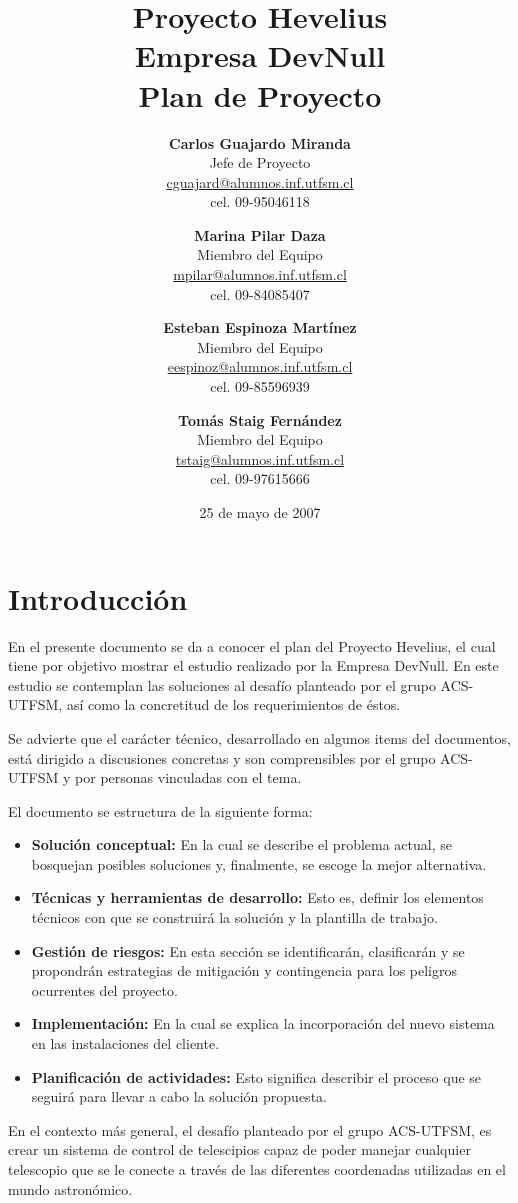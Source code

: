 \documentclass[letterpaper,spanish,10pt]{article}
\title{{\Huge \bf Proyecto Hevelius} \\ {\Large Empresa DevNull} \\ {\small Plan de Proyecto}}
\author{
{\bf Carlos Guajardo Miranda} \\ Jefe de Proyecto \\ \url{cguajard@alumnos.inf.utfsm.cl} \\ cel. 09-95046118 
\and
{\bf Marina Pilar Daza} \\ Miembro del Equipo \\ \url{mpilar@alumnos.inf.utfsm.cl} \\ cel. 09-84085407
\and
{\bf Esteban Espinoza Mart\'inez} \\ Miembro del Equipo \\ \url{eespinoz@alumnos.inf.utfsm.cl} \\ cel. 09-85596939
\and
{\bf Tom\'as Staig Fern\'andez} \\ Miembro del Equipo \\ \url{tstaig@alumnos.inf.utfsm.cl} \\ cel. 09-97615666
}
\date{25 de mayo de 2007}
\begin{document}
\maketitle
\newpage

\tableofcontents{}
\newpage




\section{Introducci\'on} %
En el presente documento se da a conocer el plan del Proyecto Hevelius, el cual 
tiene por objetivo mostrar el estudio realizado por la Empresa DevNull. 
En este estudio se contemplan las soluciones al desaf\'io planteado por el grupo
ACS-UTFSM, as\'i como la concretitud de los requerimientos de \'estos.

Se advierte que el car\'acter t\'ecnico, desarrollado en algunos items del documentos,
est\'a dirigido a discusiones concretas y son comprensibles por el grupo ACS-UTFSM 
y por personas vinculadas con el tema.

El documento se estructura de la siguiente forma:
\begin{itemize}
        \item \textbf{Soluci\'on conceptual:} En la cual se describe el problema 
actual, se bosquejan posibles soluciones y, finalmente, se escoge la mejor alternativa.
        \item \textbf{T\'ecnicas y herramientas de desarrollo:} Esto es, definir 
los elementos t\'ecnicos con que se construir\'a la soluci\'on y la plantilla de trabajo.
        \item \textbf{Gesti\'on de riesgos:} En esta secci\'on se identificar\'an, 
clasificar\'an y se propondr\'an estrategias de mitigaci\'on y contingencia para los 
peligros ocurrentes del proyecto.
        \item \textbf{Implementaci\'on:} En la cual se explica la incorporaci\'on del 
nuevo sistema en las instalaciones del cliente.
        \item \textbf{Planificaci\'on de actividades:} Esto significa describir el 
proceso que se seguir\'a para llevar a cabo la soluci\'on propuesta.
\end{itemize}

En el contexto m\'as general, el desaf\'io planteado por el grupo ACS-UTFSM, es 
crear un sistema de control de telescipios capaz de poder manejar cualquier telescopio 
que se le conecte a trav\'es de las diferentes coordenadas utilizadas en el mundo 
astron\'omico.\\
\end{document}
